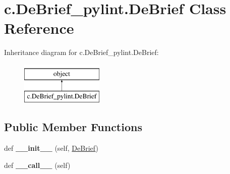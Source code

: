 \hypertarget{classc_1_1_de_brief__pylint_1_1_de_brief}{}\section{c.\+De\+Brief\+\_\+pylint.\+De\+Brief Class Reference}
\label{classc_1_1_de_brief__pylint_1_1_de_brief}
Inheritance diagram for c.\+De\+Brief\+\_\+pylint.\+De\+Brief\+:\begin{figure}[H]
\begin{center}
\leavevmode
\includegraphics[height=2.000000cm]{classc_1_1_de_brief__pylint_1_1_de_brief}
\end{center}
\end{figure}
\subsection*{Public Member Functions}
\begin{DoxyCompactItemize}
\item 
\hypertarget{classc_1_1_de_brief__pylint_1_1_de_brief_a6df6aeb760cc7d7d6b817a7426cb078f}{}def {\bfseries \+\_\+\+\_\+init\+\_\+\+\_\+} (self, \hyperlink{classc_1_1_de_brief__pylint_1_1_de_brief}{De\+Brief})\label{classc_1_1_de_brief__pylint_1_1_de_brief_a6df6aeb760cc7d7d6b817a7426cb078f}

\item 
\hypertarget{classc_1_1_de_brief__pylint_1_1_de_brief_a3da2da9552412f9aa89a36d73997c8fc}{}def {\bfseries \+\_\+\+\_\+call\+\_\+\+\_\+} (self)\label{classc_1_1_de_brief__pylint_1_1_de_brief_a3da2da9552412f9aa89a36d73997c8fc}

\end{DoxyCompactItemize}
